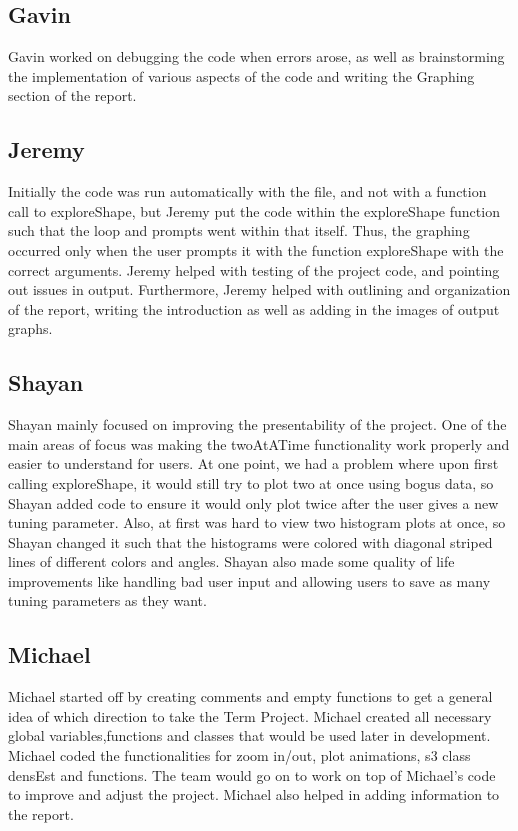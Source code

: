 \documentclass{article}
\begin{document}
\subsection{Gavin}
Gavin worked on debugging the code when errors arose, as well as brainstorming the implementation of various aspects of the code and writing the Graphing section of the report.

\subsection{Jeremy}
Initially the code was run automatically with the file, and not with a function call to exploreShape, but Jeremy put the code within the exploreShape function such that the loop and prompts went within that itself. Thus, the graphing occurred only when the user prompts it with the function exploreShape with the correct arguments. Jeremy helped with testing of the project code, and pointing out issues in output. Furthermore, Jeremy helped with outlining and organization of the report, writing the introduction as well as adding in the images of output graphs.

\subsection{Shayan}
Shayan mainly focused on improving the presentability of the project. One of the main areas of focus was making the twoAtATime
functionality work properly and easier to understand for users. At one point, we had a problem where upon first calling
exploreShape, it would still try to plot two at once using bogus data, so Shayan added code to ensure it would only plot twice
after the user gives a new tuning parameter. Also, at first was hard to view two histogram plots at once, so Shayan changed
it such that the histograms were colored with diagonal striped lines of different colors and angles. Shayan also made some
quality of life improvements like handling bad user input and allowing users to save as many tuning parameters as they want.

\subsection{Michael}
Michael started off by creating comments and empty functions to get a general idea of which direction to take the Term Project. Michael created all necessary global variables,functions and classes that would be used later in development. Michael coded the functionalities for zoom in/out, plot animations, s3 class densEst and functions. The team would go on to work on top of Michael's code to improve and adjust the project. Michael also helped in adding information to the report.
\end{document}
